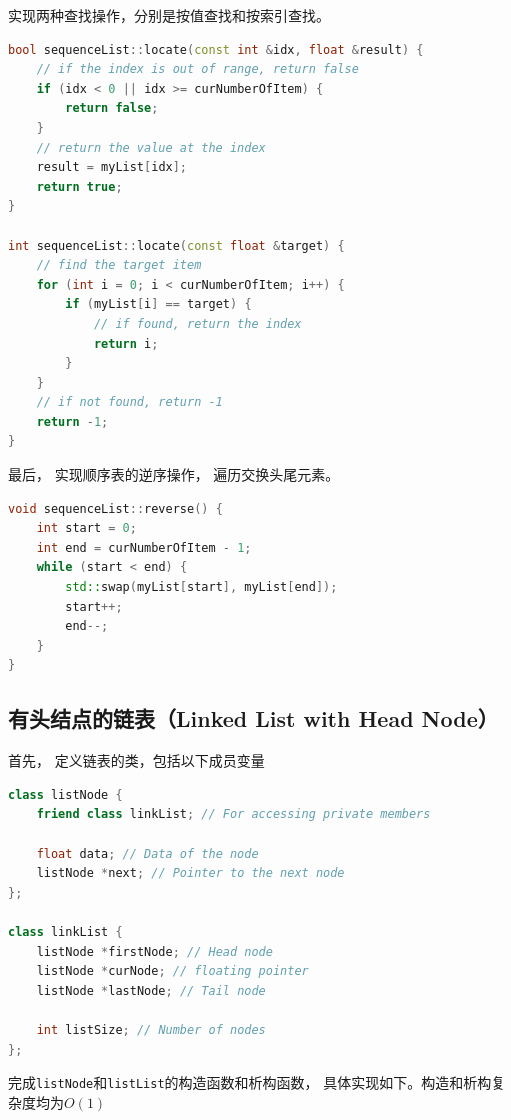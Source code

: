 \documentclass{csexp}
\begin{document}
实现两种查找操作，分别是按值查找和按索引查找。

\begin{lstlisting}[language=C++]
bool sequenceList::locate(const int &idx, float &result) {
    // if the index is out of range, return false
    if (idx < 0 || idx >= curNumberOfItem) {
        return false;
    }
    // return the value at the index
    result = myList[idx];
    return true;
}

int sequenceList::locate(const float &target) {
    // find the target item
    for (int i = 0; i < curNumberOfItem; i++) {
        if (myList[i] == target) {
            // if found, return the index
            return i;
        }
    }
    // if not found, return -1
    return -1;
}
\end{lstlisting}

最后， 实现顺序表的逆序操作， 遍历交换头尾元素。

\begin{lstlisting}[language=C++]
void sequenceList::reverse() {
    int start = 0;
    int end = curNumberOfItem - 1;
    while (start < end) {
        std::swap(myList[start], myList[end]);
        start++;
        end--;
    }
}
\end{lstlisting}

\subsection{有头结点的链表（Linked List with Head Node）}

首先， 定义链表的类，包括以下成员变量

\begin{lstlisting}[language=C++]
class listNode {
    friend class linkList; // For accessing private members

    float data; // Data of the node
    listNode *next; // Pointer to the next node
};

class linkList {
    listNode *firstNode; // Head node
    listNode *curNode; // floating pointer
    listNode *lastNode; // Tail node

    int listSize; // Number of nodes
};
\end{lstlisting}

完成\texttt{listNode}和\texttt{listList}的构造函数和析构函数， 具体实现如下。构造和析构复杂度均为$O(1)$
\end{document}

